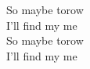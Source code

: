 \songwordfb{ } So maybe torow \\
I'll find my  me \\
\songwordfb{ } So maybe torow \\
I'll find my  me \\
 
 